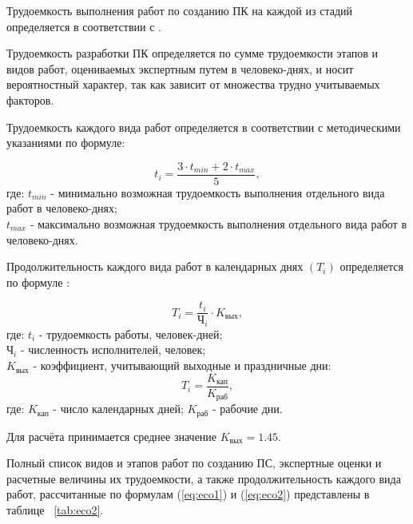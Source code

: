 Трудоемкость выполнения работ по созданию ПК  на каждой из стадий определяется в соответствии с \cite{bibl52, bibl53}.

Трудоемкость разработки ПК определяется по сумме трудоемкости этапов и видов работ, оцениваемых экспертным путем в
человеко-днях, и носит вероятностный характер, так как зависит от множества трудно учитываемых факторов.

Трудоемкость каждого вида работ определяется в соответствии с методическими указаниями \cite{bibl53} по формуле:

\begin{equation}
t_i = \frac{3\cdot{t_{min}} + 2\cdot{t_{max}}}{5},
\label{eq:eco1}
\end{equation}
где:	$t_{min}$ - минимально возможная трудоемкость выполнения отдельного вида работ в человеко-днях; \\
	$t_{max}$ - максимально возможная трудоемкость выполнения отдельного вида работ в человеко-днях.

Продолжительность каждого вида работ в календарных днях ${(T_i)}$ определяется по формуле \cite{bibl53}:

\begin{equation}
T_i = \frac{t_i}{\mbox{Ч}_i}\cdot{K_{\mbox{вых}}},
\label{eq:eco2}
\end{equation}
где:	${t_i}$ - трудоемкость работы, человек-дней; \\
	${\mbox{Ч}_i}$ - численность исполнителей, человек; \\
	${K_{\mbox{вых}}}$ - коэффициент, учитывающий выходные и праздничные дни: \\

\begin{equation}
T_i = \frac{K_{\mbox{кап}}}{K_{\mbox{раб}}},
\label{eq:eco3}
\end{equation}
где:	${K_{\mbox{кап}}}$ - число календарных дней;
	${K_{\mbox{раб}}}$ - рабочие дни.

Для расчёта принимается среднее значение ${K_{\mbox{вых}} = 1.45}$. 

Полный список видов и этапов работ по созданию ПС, экспертные оценки и расчетные величины их трудоемкости,
а также продолжительность каждого вида работ, рассчитанные по формулам (\ref{eq:eco1}) и (\ref{eq:eco2}) представлены
в таблице ~\ref{tab:eco2}.



